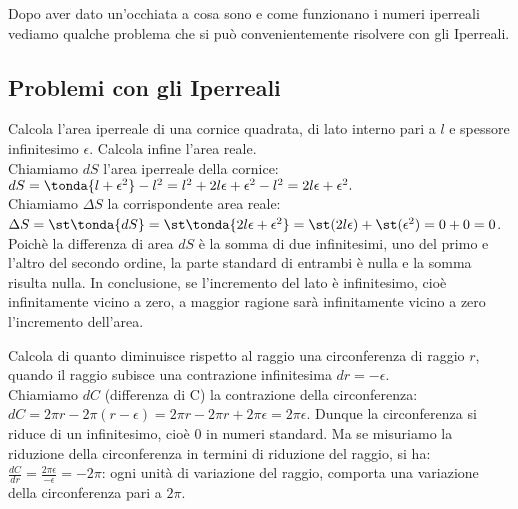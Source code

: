 Dopo aver dato un'occhiata a cosa sono e come funzionano i numeri iperreali 
vediamo qualche problema che si può convenientemente risolvere con gli 
Iperreali.

\subsection{Problemi con gli Iperreali}
\label{subsec:insnum_problemi}

\begin{esempio}
Calcola l'area iperreale di una cornice quadrata, di lato interno pari a $l$ e
spessore infinitesimo $\epsilon$. Calcola infine l'area reale.\\
Chiamiamo $dS$ l'area iperreale della cornice:
\(dS=\tonda{l+\epsilon^2}
-l^2=l^2+2l\epsilon+\epsilon^2-l^2=2l\epsilon+\epsilon^2.\)\\
Chiamiamo $\Delta S$ la corrispondente area reale:
\(\Delta S=\st\tonda{dS}=\st\tonda{2l\epsilon+\epsilon^2}=
\st(2l\epsilon)+\st(\epsilon^2)=0+0=0\).\\
Poichè la differenza di area $dS$ è la somma di due infinitesimi, uno del 
primo e 
l'altro del secondo ordine, la parte standard di entrambi è nulla e la somma 
risulta nulla. In conclusione, se l'incremento del lato è infinitesimo,
cioè infinitamente vicino a zero, a maggior ragione sarà infinitamente vicino
a zero l'incremento dell'area.
\end{esempio}

\begin{esempio}
Calcola di quanto diminuisce rispetto al raggio una circonferenza di raggio 
$r$,
quando il raggio subisce una contrazione infinitesima $dr=-\epsilon$.\\
Chiamiamo $dC$ (differenza di C) la contrazione della circonferenza:
\(dC=2\pi r-2\pi (r-\epsilon)=2\pi r-2\pi r+2\pi \epsilon= 2\pi \epsilon\).
Dunque la circonferenza si riduce di un infinitesimo, cioè $0$ in numeri 
standard.
Ma se misuriamo la riduzione della circonferenza in termini
di riduzione del raggio, si ha:
\(\frac{dC}{dr}=\frac{2\pi \epsilon}{-\epsilon}=-2\pi\): ogni unità di 
variazione 
del raggio, comporta una variazione della circonferenza pari a $2\pi$.
\end{esempio}

